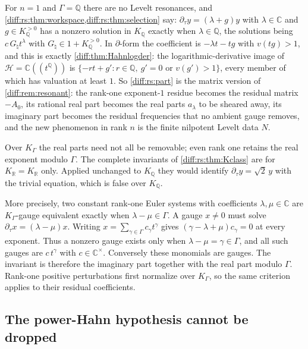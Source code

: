 \documentclass[11pt,letterpaper]{article}
\numberwithin{equation}{section}
\theoremstyle{definition}
\theoremstyle{remark}
\newcommand{\R}{\mathbb R}
\newcommand{\C}{\mathbb C}
\newcommand{\Q}{\mathbb Q}
\newcommand{\der}{\partial}
\newcommand{\Hring}{\mathscr H}
\newcommand{\derT}{\der_{\tau}}
\newcommand{\KR}{K_{\R}}
\begin{document}
\begin{remark}
\label{diff:rs:rem:rankone}
For $n=1$ and $\Gamma=\Q$ there are no Levelt resonances, and
\cref{diff:rs:thm:workspace,diff:rs:thm:selection} say: $\derT y=(\lambda+g)y$
with $\lambda\in\C$ and $g\in K_{\Q}^{>0}$ has a nonzero solution in $K_{\Q}$
exactly when $\lambda\in\Q$, the solutions being $c\,G_{\natural}t^{\lambda}$ with
$G_{\natural}\in1+K_{\Q}^{>0}$. In $\der$-form the coefficient is
$-\lambda t-tg$ with $v(tg)>1$, and this is exactly \cref{diff:thm:Hahnlogder}:
the logarithmic-derivative image of $\Hring=\C((t^{\Q}))$ is
$\{-rt+g':r\in\Q,\ g'=0\text{ or }v(g')>1\}$, every member of which has
valuation at least $1$. So \cref{diff:rs:part} is the matrix version of
\cref{diff:rem:resonant}: the rank-one exponent-$1$ residue becomes the residual
matrix $-A_{0}$, its rational real part becomes the real parts $a_{\lambda}$ to be
sheared away, its imaginary part becomes the residual frequencies that no
ambient gauge removes, and the new phenomenon in rank $n$ is the finite
nilpotent Levelt data $N$.
\end{remark}

\begin{remark}
\label{diff:rs:rem:notbackwards}
Over $K_{\Gamma}$ the real parts need not all be removable; even rank one retains
the real exponent modulo $\Gamma$. The complete invariants of
\cref{diff:rs:thm:Kclass} are for $\KR=K_{\R}$ only. Applied unchanged to $K_{\Q}$
they would identify $\derT y=\sqrt2\,y$ with the trivial equation, which is false
over $K_{\Q}$.

More precisely, two constant rank-one Euler systems with coefficients
$\lambda,\mu\in\C$ are $K_\Gamma$-gauge equivalent exactly when
$\lambda-\mu\in\Gamma$. A gauge $x\neq0$ must solve
$\derT x=(\lambda-\mu)x$. Writing
$x=\sum_{\gamma\in\Gamma}c_\gamma t^\gamma$ gives
$(\gamma-\lambda+\mu)c_\gamma=0$ at every exponent. Thus a nonzero
gauge exists only when $\lambda-\mu=\gamma\in\Gamma$, and all such
gauges are $c\,t^\gamma$ with $c\in\C^\times$. Conversely these
monomials are gauges. The invariant is therefore the imaginary part
together with the real part modulo $\Gamma$. Rank-one positive
perturbations first normalize over $K_\Gamma$, so the same criterion
applies to their residual coefficients.
\end{remark}

\subsection{The power-Hahn hypothesis cannot be dropped}
\label{diff:rs:sub:boundary}
\end{document}
